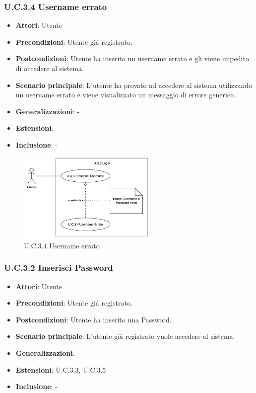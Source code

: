 \subsubsection{U.C.3.4 Username errato}
\begin{itemize}
    \item \textbf{Attori}: Utente
    \item \textbf{Precondizioni}: Utente già registrato.
    \item \textbf{Postcondizioni}: Utente ha inserito un username errato e gli viene impedito di accedere al sistema.
    \item \textbf{Scenario principale}: L’utente ha provato ad accedere al sistema utilizzando un username errato e viene visualizzato un messaggio di errore generico.
    \item \textbf{Generalizzazioni}: -
    \item \textbf{Estensioni}: -
    \item \textbf{Inclusione}: -
\end{itemize}
\begin{figure}[H]
    \centering
    \includegraphics[width=0.6\textwidth]{img/UC3-4.png}
    \caption{U.C.3.4 Username errato}
\end{figure}
\subsubsection{U.C.3.2 Inserisci Password}
\begin{itemize}
    \item \textbf{Attori}: Utente
    \item \textbf{Precondizioni}: Utente già registrato.
    \item \textbf{Postcondizioni}: Utente ha inserito una Password.
    \item \textbf{Scenario principale}: L'utente già registrato vuole accedere al sistema.
    \item \textbf{Generalizzazioni}: -
    \item \textbf{Estensioni}: U.C.3.3, U.C.3.5
    \item \textbf{Inclusione}: -
\end{itemize}
